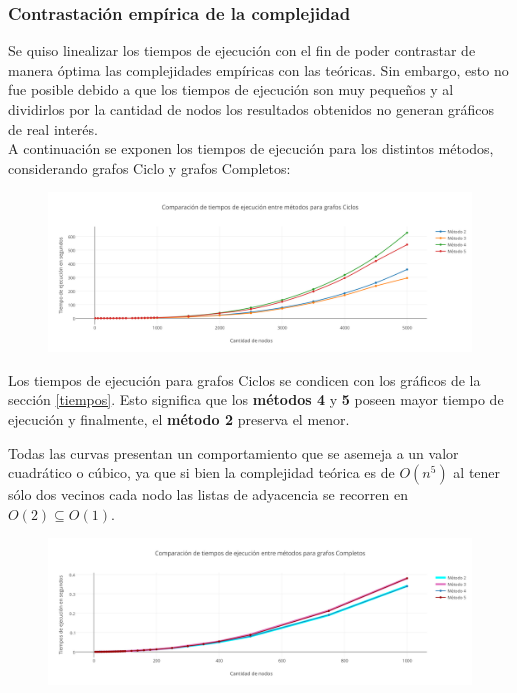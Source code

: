  \newpage
\subsubsection{Contrastaci\'on emp\'irica de la complejidad}

Se quiso linealizar los tiempos de ejecuci\'on con el fin de poder contrastar de manera \'optima las complejidades emp\'iricas con las te\'oricas. Sin embargo, esto no fue posible debido a que los tiempos de ejecuci\'on son muy peque\~nos y al dividirlos por la cantidad de nodos los resultados obtenidos no generan gr\'aficos de real inter\'es.\\

A continuaci\'on se exponen los tiempos de ejecuci\'on para los distintos m\'etodos, considerando grafos Ciclo y grafos Completos:

  \begin{figure}[h!]
   \begin{center}
 	\includegraphics[scale=0.55]{imagenes/local/tiempos/ciclos.png}
   \end{center}
 \end{figure} 
 
Los tiempos de ejecuci\'on para grafos Ciclos se condicen con los gr\'aficos de la secci\'on \ref{tiempos}. Esto significa que los \textbf{m\'etodos 4} y \textbf{5} poseen mayor tiempo de ejecuci\'on y finalmente, el \textbf{m\'etodo 2} preserva el menor.

Todas las curvas presentan un comportamiento que se asemeja a un valor cuadr\'atico  o c\'ubico, ya que si bien la complejidad te\'orica es de $O(n^5)$ al tener s\'olo dos vecinos cada nodo las listas de adyacencia se recorren en $O(2)\subseteq O(1)$.
 
   \begin{figure}[h!]
   \begin{center}
 	\includegraphics[scale=0.55]{imagenes/local/tiempos/completos.png}
   \end{center}
 \end{figure} 
 
